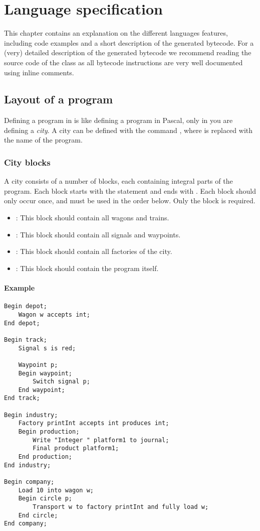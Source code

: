 \chapter{Language specification}

This chapter contains an explanation on the different languages features, including code examples and a short description of the generated bytecode. For a (very) detailed description of the generated bytecode we recommend reading the source code of the  class as all bytecode instructions are very well documented using inline comments.

\section{Layout of a program}

Defining a program in \shortname is like defining a program in Pascal, only in \shortname you are defining a \emph{city}. A city can be defined with the command , where  is replaced with the name of the program.

\subsection{City blocks}

A city consists of a number of blocks, each containing integral parts of the program. Each block starts with the statement  and ends with . Each block should only occur once, and must be used in the order below. Only the  block is required.

\begin{itemize}
\item {}: This block should contain all wagons and trains.
\item {}: This block should contain all signals and waypoints.
\item {}: This block should contain all factories of the city.
\item {}: This block should contain the program itself.
\end{itemize}

\subsubsection*{Example}

\begin{lstlisting}
Begin depot;
	Wagon w accepts int;
End depot;

Begin track;
	Signal s is red;
	
	Waypoint p;
	Begin waypoint;
		Switch signal p;
	End waypoint;
End track;

Begin industry;
	Factory printInt accepts int produces int;
	Begin production;
		Write "Integer " platform1 to journal;
		Final product platform1;
	End production;
End industry;

Begin company;
	Load 10 into wagon w;
	Begin circle p;
		Transport w to factory printInt and fully load w;
	End circle;
End company;
\end{lstlisting}

